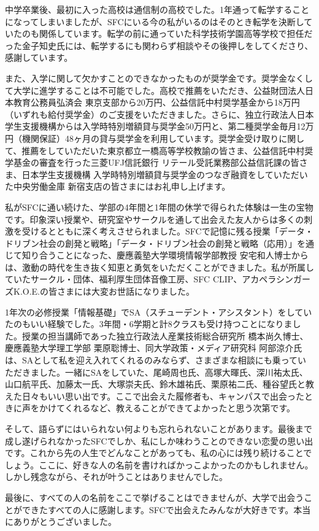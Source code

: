 \begin{acknowledgment}
  中学卒業後、最初に入った高校は通信制の高校でした。1年通って転学することになってしまいましたが、SFCにいる今の私がいるのはそのとき転学を決断していたのも関係しています。転学の前に通っていた科学技術学園高等学校で担任だった金子知史氏には、転学するにも関わらず相談やその後押しをしてくださり、感謝しています。

  また、入学に関して欠かすことのできなかったものが奨学金です。奨学金なくして大学に進学することは不可能でした。高校で推薦をいただき、公益財団法人日本教育公務員弘済会 東京支部から20万円、公益信託中村奨学基金から18万円（いずれも給付奨学金）のご支援をいただきました。さらに、独立行政法人日本学生支援機構からは入学時特別増額貸与奨学金50万円と、第二種奨学金毎月12万円（機関保証）48ヶ月の貸与奨学金を利用しています。奨学金受け取りに関して、推薦をしていただいた東京都立一橋高等学校教諭の皆さま、公益信託中村奨学基金の審査を行った三菱UFJ信託銀行 リテール受託業務部公益信託課の皆さま、日本学生支援機構 入学時特別増額貸与奨学金のつなぎ融資をしていただいた中央労働金庫 新宿支店の皆さまにはお礼申し上げます。

  私がSFCに通い続けた、学部の4年間と1年間の休学で得られた体験は一生の宝物です。印象深い授業や、研究室やサークルを通して出会えた友人からは多くの刺激を受けるとともに深く考えさせられました。SFCで記憶に残る授業「データ・ドリブン社会の創発と戦略」「データ・ドリブン社会の創発と戦略（応用）」を通じて知り合うことになった、慶應義塾大学環境情報学部教授 安宅和人博士からは、激動の時代を生き抜く知恵と勇気をいただくことができました。私が所属していたサークル・団体、福利厚生団体音像工房、SFC CLIP、アカペラシンガーズK.O.E.の皆さまには大変お世話になりました。

  1年次の必修授業「情報基礎」でSA（スチューデント・アシスタント）をしていたのもいい経験でした。3年間・6学期と計8クラスも受け持つことになりました。授業の担当講師であった独立行政法人産業技術総合研究所 橋本尚久博士、慶應義塾大学理工学部 栗原聡博士、同大学政策・メディア研究科 阿部涼介氏は、SAとして私を迎え入れてくれるのみならず、さまざまな相談にも乗っていただきました。一緒にSAをしていた、尾崎周也氏、高塚大暉氏、深川祐太氏、山口航平氏、加藤太一氏、大塚崇夫氏、鈴木雄祐氏、栗原祐二氏、種谷望氏と教えた日々もいい思い出です。ここで出会えた履修者も、キャンパスで出会ったときに声をかけてくれるなど、教えることができてよかったと思う次第です。

  そして、語らずにはいられない何よりも忘れられないことがあります。最後まで成し遂げられなかったSFCでしか、私にしか味わうことのできない恋愛の思い出です。これから先の人生でどんなことがあっても、私の心には残り続けることでしょう。ここに、好きな人の名前を書ければかっこよかったのかもしれません。しかし残念ながら、それが叶うことはありませんでした。

  最後に、すべての人の名前をここで挙げることはできませんが、大学で出会うことができたすべての人に感謝します。SFCで出会えたみんなが大好きです。本当にありがとうございました。

\end{acknowledgment}
